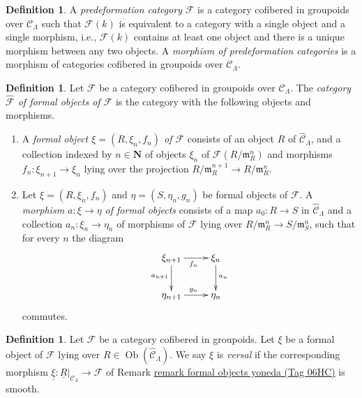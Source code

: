 \documentclass{amsart}
\theoremstyle{plain}
\theoremstyle{definition}
\newtheorem{definition}[subsection]{Definition}
\theoremstyle{remark}
\numberwithin{equation}{subsection}
\def\Ob{\mathop{\mathrm{Ob}}\nolimits}
\begin{document}
\begin{definition}
\label{definition-predeformation-category}
A {\it predeformation category} $\mathcal{F}$ is a category cofibered
in groupoids over $\mathcal{C}_\Lambda$ such that $\mathcal{F}(k)$ is
equivalent to a category with a single object and a single morphism,
i.e., $\mathcal{F}(k)$ contains at least one object and there is a
unique morphism between any two objects. A {\it morphism of predeformation
categories} is a morphism of categories cofibered in groupoids over
$\mathcal{C}_\Lambda$.
\end{definition}

\begin{definition}
\label{definition-formal-objects}
Let $\mathcal{F}$ be a category cofibered in groupoids over
$\mathcal{C}_\Lambda$. The {\it category $\widehat{\mathcal{F}}$ of formal
objects of  $\mathcal{F}$} is the category with the following objects and
morphisms.
\begin{enumerate}
\item A {\it formal object $\xi = (R, \xi_n, f_n)$ of $\mathcal{F}$}
consists of an object $R$ of $\widehat{\mathcal{C}}_\Lambda$, and a collection
indexed by $n \in \mathbf{N}$ of objects $\xi_n$ of
$\mathcal{F}(R/\mathfrak m_R^n)$ and morphisms
$f_n : \xi_{n + 1} \to \xi_n$ lying over the projection
$R/\mathfrak m_R^{n + 1} \to R/\mathfrak m_R^n$.
\item Let $\xi = (R, \xi_n, f_n)$ and $\eta = (S, \eta_n, g_n)$ be
formal objects of $\mathcal{F}$.  A {\it morphism $a : \xi \to \eta$ of
formal objects} consists of a map $a_0 : R \to S$ in
$\widehat{\mathcal{C}}_\Lambda$ and a collection $a_n : \xi_n \to \eta_n$
of morphisms of $\mathcal{F}$ lying over
$R/\mathfrak m_R^n \to S/\mathfrak m_S^n$,
such that for every $n$ the diagram
$$
\xymatrix{
\xi_{n + 1} \ar[r]_{f_n} \ar[d]_{a_{n + 1}} & \xi_n \ar[d]^{a_n} \\
\eta_{n + 1} \ar[r]^{g_n} & \eta_n
}
$$
commutes.
\end{enumerate}
\end{definition}

\begin{definition}
\label{definition-versal}
Let $\mathcal{F}$ be a category cofibered in groupoids.  Let $\xi$ be a formal
object of $\mathcal{F}$ lying over $R \in \Ob(\widehat{\mathcal{C}}_\Lambda)$.
We say $\xi$ is {\it versal} if the corresponding morphism
$\underline{\xi}: \underline{R}|_{\mathcal{C}_\Lambda} \to \mathcal{F}$
of Remark \href{https://stacks.math.columbia.edu/tag/06HC}{remark formal objects yoneda (Tag 06HC)} is smooth.
\end{definition}
\end{document}
